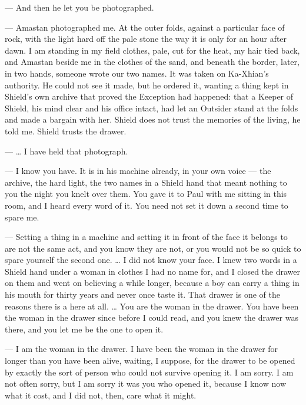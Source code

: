 \begin{room}

--- And then he let you be photographed.

--- Amastan photographed me. At the outer folds, against a particular face of rock, with the light hard off the pale stone the way it is only for an hour after dawn. I am standing in my field clothes, pale, cut for the heat, my hair tied back, and Amastan beside me in the clothes of the sand, and beneath the border, later, in two hands, someone wrote our two names. It was taken on Ka-Xhian's authority. He could not see it made, but he ordered it, wanting a thing kept in Shield's own archive that proved the Exception had happened: that a Keeper of Shield, his mind clear and his office intact, had let an Outsider stand at the folds and made a bargain with her. Shield does not trust the memories of the living, he told me. Shield trusts the drawer.

--- \ldots{} I have held that photograph.

--- I know you have. It is in his machine already, in your own voice --- the archive, the hard light, the two names in a Shield hand that meant nothing to you the night you knelt over them. You gave it to Paul with me sitting in this room, and I heard every word of it. You need not set it down a second time to spare me.

--- Setting a thing in a machine and setting it in front of the face it belongs to are not the same act, and you know they are not, or you would not be so quick to spare yourself the second one. \ldots{} I did not know your face. I knew two words in a Shield hand under a woman in clothes I had no name for, and I closed the drawer on them and went on believing a while longer, because a boy can carry a thing in his mouth for thirty years and never once taste it. That drawer is one of the reasons there is a here at all. \ldots{} You are the woman in the drawer. You have been the woman in the drawer since before I could read, and you knew the drawer was there, and you let me be the one to open it.

--- I am the woman in the drawer. I have been the woman in the drawer for longer than you have been alive, waiting, I suppose, for the drawer to be opened by exactly the sort of person who could not survive opening it. I am sorry. I am not often sorry, but I am sorry it was you who opened it, because I know now what it cost, and I did not, then, care what it might.

\end{room}

